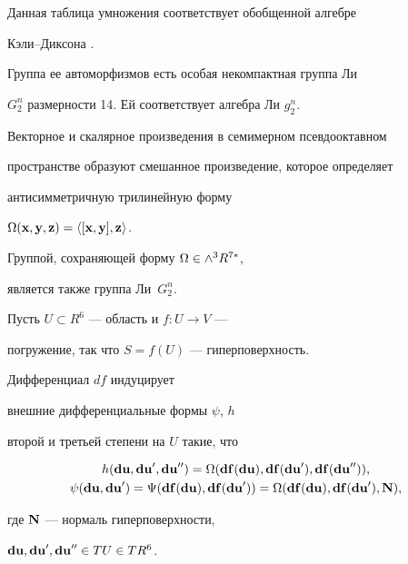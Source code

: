 Данная таблица умножения соответствует обобщенной алгебре


Кэли--Диксона \cite{1}.


Группа ее автоморфизмов есть особая некомпактная группа Ли


$G_2^n$ размерности 14. Ей соответствует алгебра Ли $g_2^n$.





Векторное и скалярное произведения в семимерном псевдооктавном


пространстве образуют смешанное произведение, которое определяет


антисимметричную трилинейную форму


$\Omega(\bold{x,y,z})=\langle [\bold x, \bold y], \bold z\rangle$.


Группой, сохраняющей форму $\Omega\in \wedge^3 R^{7*}$,


является также группа Ли~$G^n_2$.





Пусть $U\subset R^6$ --- область и $f:U\rightarrow V$ ---


погружение, так что $S=f(U)$ --- гиперповерхность.


Дифференциал $df$ индуцирует


внешние дифференциальные формы $\psi$, $h$


второй и третьей степени на $U$ такие, что


\begin{gather*}


h(\bold{du}, \bold{du}',


\bold{du}'')=\Omega(\bold{df}(\bold{du}),


\bold{df}(\bold{du}'),\bold{df}(\bold{du}'')),\\


%


\psi(\bold{du}, \bold{du}')=\Psi(\bold{df}(\bold{du}),


\bold{df}(\bold{du}'))=


\Omega(\bold{df}(\bold{du}),


\bold{df}(\bold{du}'),\bold{N}),


\end{gather*}


где $\bold{N}$ --- нормаль гиперповерхности,


$\bold{du}, \bold{du}', \bold{du}''\in TU\in TR^6$.





